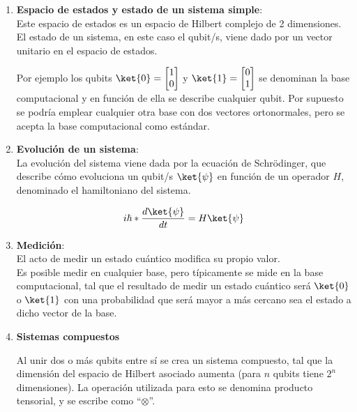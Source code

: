 \begin{enumerate}
\item \textbf{Espacio de estados y estado de un sistema simple}:
  \\
  Este espacio de estados es un espacio de Hilbert complejo de 2 dimensiones.
  El estado de un sistema, en este caso el qubit/s, viene dado por un vector unitario en el espacio de estados.
  
  Por ejemplo los qubits $\ket{0} = \begin{bmatrix} 1 \\ 0 \end{bmatrix}$ y $\ket{1} = \begin{bmatrix} 0 \\ 1 \end{bmatrix}$ se denominan la base computacional y en función de ella se describe cualquier qubit.
  Por supuesto se podría emplear cualquier otra base con dos vectores ortonormales, pero se acepta la base computacional como estándar.
  
\item \textbf{Evolución de un sistema}:
  \\
  La evolución del sistema viene dada por la ecuación de Schrödinger, que describe cómo evoluciona un qubit/s $\ket{\psi}$ en función de un operador $H$, denominado el hamiltoniano del sistema.

  \begin{align}
    i \hbar * \frac{d \ket{\psi}}{d t} = H \ket{\psi}
  \end{align}
  
\item \textbf{Medición}:
  \\
  El acto de medir un estado cuántico modifica su propio valor.
  \\
  Es posible medir en cualquier base, pero típicamente se mide en la base computacional, tal que el resultado de medir un estado cuántico será $\ket{0}$ o $\ket{1}$ con una probabilidad que será mayor a más cercano sea el estado a dicho vector de la base.

\item \textbf{Sistemas compuestos}

  Al unir dos o más qubits entre sí se crea un sistema compuesto, tal que la dimensión del espacio de Hilbert asociado aumenta (para $n$ qubits tiene $2^n$ dimensiones).
  La operación utilizada para esto se denomina producto tensorial, y se escribe como ``$\otimes$''.

\end{enumerate}


